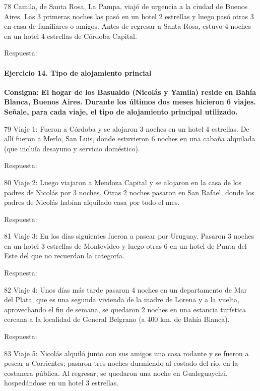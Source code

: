 \documentclass[
  openany]{book}
\begin{document}
78 Camila, de Santa Rosa, La Pampa, viajó de urgencia a la ciudad de Buenos Aires. Las 3 primeras noches las pasó en un hotel 2 estrellas y luego pasó otras 3 en casa de familiares o amigos. Antes de regresar a Santa Rosa, estuvo 4 noches en un hotel 4 estrellas de Córdoba Capital.

Respuesta:

\hypertarget{ejercicio-14.-tipo-de-alojamiento-princial}{%
\paragraph{Ejercicio 14. Tipo de alojamiento princial}\label{ejercicio-14.-tipo-de-alojamiento-princial}}

\textbf{Consigna: El hogar de los Basualdo (Nicolás y Yamila) reside en Bahía Blanca, Buenos Aires. Durante los últimos dos meses hicieron 6 viajes. Señale, para cada viaje, el tipo de alojamiento principal utilizado.}

79 Viaje 1: Fueron a Córdoba y se alojaron 3 noches en un hotel 4 estrellas. De allí fueron a Merlo, San Luis, donde estuvieron 6 noches en una cabaña alquilada (que incluía desayuno y servicio doméstico).

Respuesta:

80 Viaje 2: Luego viajaron a Mendoza Capital y se alojaron en la casa de los padres de Nicolás por 3 noches. Otras 2 noches pasaron en San Rafael, donde los padres de Nicolás habían alquilado casa por todo el mes.

Respuesta:

81 Viaje 3: En los días siguientes fueron a pasear por Uruguay. Pasaron 3 noches en un hotel 3 estrellas de Montevideo y luego otras 6 en un hotel de Punta del Este del que no recuerdan la categoría.

Respuesta:

82 Viaje 4: Unos días más tarde pasaron 4 noches en un departamento de Mar del Plata, que es una segunda vivienda de la madre de Lorena y a la vuelta, aprovechando el fin de semana, se quedaron 2 noches en una estancia turística cercana a la localidad de General Belgrano (a 400 km. de Bahía Blanca).

Respuesta:

83 Viaje 5: Nicolás alquiló junto con sus amigos una casa rodante y se fueron a pescar a Corrientes; pasaron tres noches durmiendo al costado del río, en la costanera pública. Al regresar, se quedaron una noche en Gualeguaychú, hospedándose en un hotel 3 estrellas.
\end{document}
